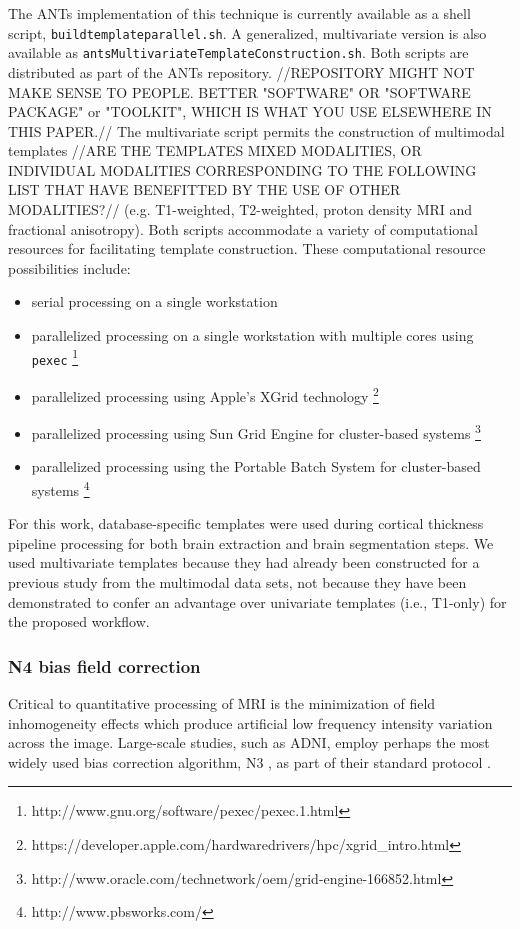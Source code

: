 The ANTs implementation of this technique is currently available as a shell script, 
{\tt buildtemplateparallel.sh}.  A generalized, multivariate version is also available as
{\tt antsMultivariateTemplateConstruction.sh}.  Both scripts are distributed as part of
 the ANTs repository.  //REPOSITORY MIGHT NOT MAKE SENSE TO PEOPLE.
 BETTER "SOFTWARE" OR "SOFTWARE PACKAGE" or "TOOLKIT", WHICH IS WHAT YOU USE ELSEWHERE IN THIS PAPER.//
The multivariate script permits the construction of multimodal templates
//ARE THE TEMPLATES MIXED MODALITIES, OR INDIVIDUAL MODALITIES CORRESPONDING TO THE FOLLOWING LIST
THAT HAVE BENEFITTED BY THE USE OF OTHER MODALITIES?//
(e.g. T1-weighted, T2-weighted, proton density MRI and fractional anisotropy).
Both scripts accommodate a variety of computational resources
for facilitating template construction.  These computational resource possibilities include:
\begin{itemize}
  \item serial processing on a single workstation
  \item parallelized processing on a single workstation with multiple cores using \verb#pexec#%
  \footnote{http://www.gnu.org/software/pexec/pexec.1.html}
  \item parallelized processing using Apple's XGrid technology%
  \footnote{https://developer.apple.com/hardwaredrivers/hpc/xgrid\_intro.html}
  \item parallelized processing using Sun Grid Engine for cluster-based systems%
  \footnote{http://www.oracle.com/technetwork/oem/grid-engine-166852.html}
  \item parallelized processing using the Portable Batch System for cluster-based systems%
  \footnote{http://www.pbsworks.com/}
\end{itemize}

For this work, database-specific templates were used during cortical thickness pipeline
processing for both brain extraction and brain segmentation steps.  We used multivariate templates
because they had already been constructed for a previous study from the multimodal data sets,
not because they have been demonstrated to confer an advantage over univariate templates (i.e., T1-only)
for the proposed workflow.

\subsubsection{N4 bias field correction}

Critical to quantitative processing of MRI is the minimization of
field inhomogeneity effects which produce artificial low frequency 
intensity variation across the image.  Large-scale studies, such
as ADNI, employ
perhaps the most widely used bias correction algorithm, N3 \citep{sled1998}, 
as part of their standard protocol \citep{boyes2008}.

